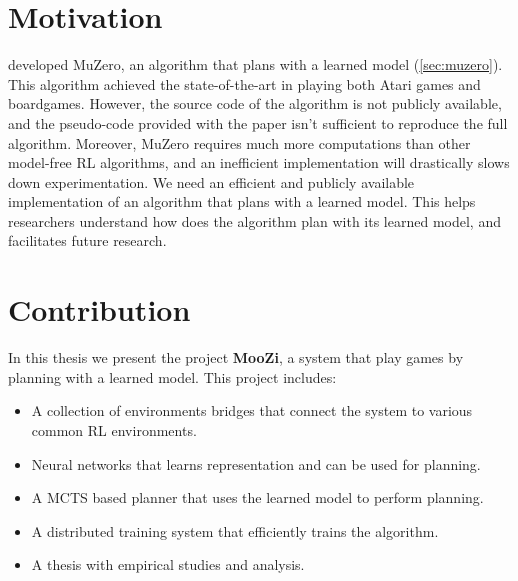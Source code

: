 \section{Motivation}
\citeauthor{MasteringAtariGo_Schrittwieser.Antonoglou.ea_2020} developed MuZero, an algorithm that plans with a learned model (\ref{sec:muzero}).
This algorithm achieved the state-of-the-art in playing both Atari games and boardgames.
However, the source code of the algorithm is not publicly available, and the pseudo-code provided with the paper isn't sufficient to reproduce the full algorithm.
Moreover, MuZero requires much more computations than other model-free RL algorithms, and an inefficient implementation will drastically slows down experimentation.
We need an efficient and publicly available implementation of an algorithm that plans with a learned model.
This helps researchers understand how does the algorithm plan with its learned model, and facilitates future research.

\section{Contribution}
In this thesis we present the project \textbf{MooZi}, a system that play games by planning with a learned model.
This project includes:
\begin{itemize}
    \item A collection of environments bridges that connect the system to various common RL environments.
    \item Neural networks that learns representation and can be used for planning.
    \item A MCTS based planner that uses the learned model to perform planning.
    \item A distributed training system that efficiently trains the algorithm.
    \item A thesis with empirical studies and analysis.
\end{itemize}